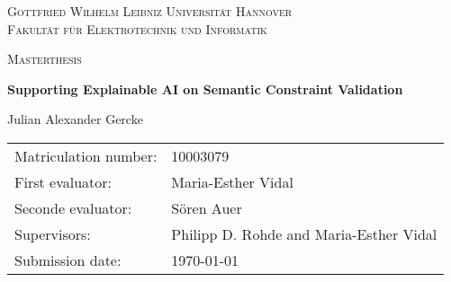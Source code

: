 \begin{titlepage}
	
	\centering
	{\scshape\LARGE Gottfried Wilhelm Leibniz Universität Hannover\\Fakultät für Elektrotechnik und Informatik\par}   %
	\vspace{1cm}
	{\scshape\Large Masterthesis\par}
	\vspace{1.5cm}
	{\huge\bfseries Supporting Explainable AI on Semantic Constraint Validation\par} 
	\vspace{2cm}
	{\Large Julian Alexander Gercke\par}
	\vfill
	
	\begin{large}
	\begin{tabular}{l l}
		Matriculation number: & 10003079\\
		First evaluator: & Maria-Esther Vidal\\
		Seconde evaluator: & Sören Auer\\
		Supervisors: & Philipp D. Rohde and Maria-Esther Vidal\\
		Submission date: & \today
	\end{tabular}
	\end{large}
\end{titlepage}